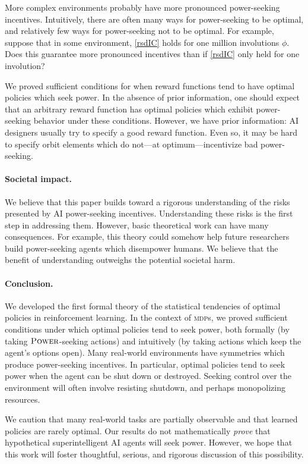 \documentclass{article}
\newcommand*{\mdp}[1][m]{{\textsc{#1dp}}}
\theoremstyle{definition}
\begin{document}
More complex environments probably have more pronounced power-seeking incentives. Intuitively, there are often many ways for power-seeking to be optimal, and relatively few ways for power-seeking not to be optimal. For example, suppose that in some environment, \cref{rsdIC} holds for one million involutions $\phi$. Does this guarantee more pronounced incentives than if \cref{rsdIC} only held for one involution?

We proved sufficient conditions for when reward functions tend to have optimal policies which seek power. In the absence of prior information, one should expect that an arbitrary reward function has optimal policies which exhibit power-seeking behavior under these conditions. However, we have prior information: AI designers usually try to specify a good reward function. Even so, it may be hard to specify orbit elements which do not—at optimum—incentivize bad power-seeking.

\paragraph{Societal impact.} We believe that this paper builds toward a rigorous understanding of the risks presented by AI power-seeking incentives. Understanding these risks is the first step in addressing them. However, basic theoretical work can have many consequences. For example, this theory could somehow help future researchers build power-seeking agents which disempower humans. We believe that the benefit of understanding outweighs the potential societal harm. 
 
\paragraph{Conclusion.} 
We developed the first formal theory of the statistical tendencies of optimal policies in reinforcement learning. In the context of {\mdp}s, we proved sufficient conditions under which optimal policies tend to seek power, both formally (by taking $\text{\upshape\textsc{Power}}$-seeking actions) and intuitively (by taking actions which keep the agent's options open). Many real-world environments have symmetries which produce power-seeking incentives. In particular, optimal policies tend to seek power when the agent can be shut down or destroyed. Seeking control over the environment will often involve resisting shutdown, and perhaps monopolizing resources.

We caution that many real-world tasks are partially observable and that learned policies are rarely optimal. Our results do not mathematically \emph{prove} that hypothetical superintelligent AI agents will seek power. However, we hope that this work will foster thoughtful, serious, and rigorous discussion of this possibility.
\end{document}
